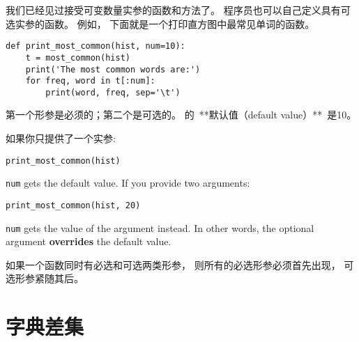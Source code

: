 我们已经见过接受可变数量实参的函数和方法了。    
程序员也可以自己定义具有可选实参的函数。    
例如， 下面就是一个打印直方图中最常见单词的函数。  


\begin{lstlisting}
def print_most_common(hist, num=10):
    t = most_common(hist)
    print('The most common words are:')
    for freq, word in t[:num]:
        print(word, freq, sep='\t')
\end{lstlisting}


第一个形参是必须的；第二个是可选的。    的\ **默认值（default
value）**\ 是10。  



如果你只提供了一个实参:

\begin{lstlisting}
print_most_common(hist)
\end{lstlisting}
{\tt num} gets the default value.  If you provide two arguments:
\begin{lstlisting}
print_most_common(hist, 20)
\end{lstlisting}
{\tt num} gets the value of the argument instead.  In other
words, the optional argument {\bf overrides} the default value.



如果一个函数同时有必选和可选两类形参， 则所有的必选形参必须首先出现， 可选形参紧随其后。  

\section{字典差集}

\label{dictsub}


